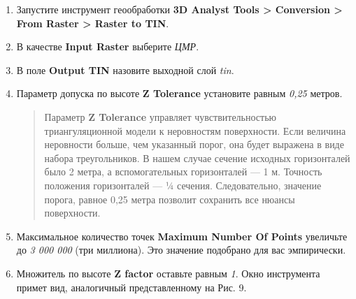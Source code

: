 \documentclass[]{book}
\theoremstyle{definition}
\theoremstyle{definition}
\theoremstyle{definition}
\theoremstyle{remark}
\begin{document}
\begin{enumerate}
\def\labelenumi{\arabic{enumi}.}
\item
  Запустите инструмент геообработки \textbf{3D Analyst Tools
  \textgreater{} Conversion \textgreater{} From Raster \textgreater{}
  Raster to TIN}.
\item
  В качестве \textbf{Input Raster} выберите \emph{ЦМР}.
\item
  В поле \textbf{Output TIN} назовите выходной слой \emph{tin}.
\item
  Параметр допуска по высоте \textbf{Z Tolerance} установите равным
  \emph{0,25} метров.

  \begin{quote}
  Параметр \textbf{Z Tolerance} управляет чувствительностью
  триангуляционной модели к неровностям поверхности. Если величина
  неровности больше, чем указанный порог, она будет выражена в виде
  набора треугольников. В нашем случае сечение исходных горизонталей
  было 2 метра, а вспомогательных горизонталей --- 1 м. Точность
  положения горизонталей --- ¼ сечения. Следовательно, значение порога,
  равное 0,25 метра позволит сохранить все нюансы поверхности.
  \end{quote}
\item
  Максимальное количество точек \textbf{Maximum Number Of Points}
  увеличьте до \emph{3 000 000} (три миллиона). Это значение подобрано
  для вас эмпирически.
\item
  Множитель по высоте \textbf{Z factor} оставьте равным \emph{1}. Окно
  инструмента примет вид, аналогичный представленному на Рис. 9.


\end{enumerate}
\end{document}
